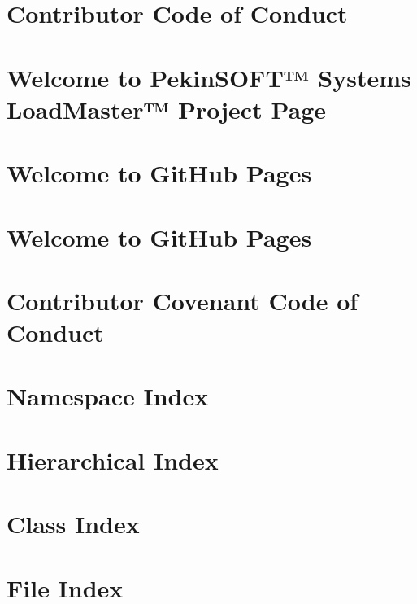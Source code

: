 \let\mypdfximage\pdfximage\def\pdfximage{\immediate\mypdfximage}\documentclass[twoside]{book}
\newcommand{\+}{\discretionary{\mbox{\scriptsize$\hookleftarrow$}}{}{}}
\begin{document}
\chapter{Contributor Code of Conduct}
\label{md_LoadMaster_CODE-OF-CONDUCT}

\chapter{Welcome to Pekin\+S\+O\+F\+T™ Systems Load\+Master™ Project Page}
\label{md_LoadMaster_docs_index}

\chapter{Welcome to Git\+Hub Pages}
\label{md_LoadMaster_B4xfer_docs_index}

\chapter{Welcome to Git\+Hub Pages}
\label{md_LoadMaster_screwedUp_docs_index}

\chapter{Contributor Covenant Code of Conduct}
\label{md_raf-db_CODE_OF_CONDUCT}

\chapter{Namespace Index}

\chapter{Hierarchical Index}

\chapter{Class Index}

\chapter{File Index}

\end{document}
